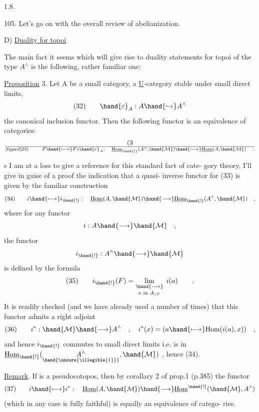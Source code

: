 
1.8. 

105.    Let's go on with the overall review of abelianization.

D)  \uline{Duality for topoi} 

The main fact it seems which will give rise to duality statements
for topoi of the type $A^\wedge$ is the following, rather familiar one:

\uline{Proposition} 3.   Let A be a small category,  a \uline{U}-category 
stable under small direct limits,
\[ (32) \qquad \hand{\varepsilon}_A : A \hand{\hookrightarrow} A^\wedge \]
the canonical inclusion functor.  Then the following functor is an
equivalence of categories:
\[ (3\over[typed]{2}{3}) \qquad F \hand{\longmapsto} F \circ \hand{\varepsilon}_A : \quad \underline{\mathrm{Hom}}_{\hand{!}}(A^\wedge,\hand{\mathcal{M}}) \hand{\longrightarrow} \underline{\mathrm{Hom}}(A,\hand{\mathcal{M}}) \quad . \]

s I am at a loss to give a reference for this standard fact of cate-%
gory theory,  I'll give in guise of a proof the indication that a quasi-
inverse functor for (33) is given by the familiar construction
\[ (34) \qquad i \hand{\longmapsto} i_{\hand{!}} : \quad \underline{\mathrm{Hom}}(A,\hand{\mathcal{M}}) \hand{\longrightarrow} \underline{\mathrm{Hom}}_{\hand{!}}(A^\wedge,\hand{\mathcal{M}}) \quad , \]
where for any functor
\[ i: A \hand{\longrightarrow} \hand{\mathcal{M}} \quad , \]
the functor  \hand{$_!$}
\[ i_{\hand{!}}: A^\wedge \hand{\longrightarrow} \hand{\mathcal{M}} \]
is defined by the formula
\[ (35) \qquad i_{\hand{!}}(F) = \mathop{\underset{\hand{\longrightarrow}}{\mathrm{lim}}}\limits_{a \text{ in } A_{/F}} \; i(a) \qquad . \]
It is readily checked (and we have already used a number of times)  that
this functor admits a right adjoint
\[ (36) \qquad i^{*} : \hand{\mathcal{M}} \hand{\longrightarrow} A^\wedge \quad , \quad i^{*}(x) = ( a \hand{\longmapsto} \mathrm{Hom}(i(a),x)) \quad , \]
and hence $i_{\hand{!}}$ commutes to small direct limits i.e. is in $\underline{\mathrm{Hom}}_{\hand{!}}(\underset{\hand{\unsure{\illegible{1}}}}{A^{\wedge}},\hand{\mathcal{M}})$ ,
hence (34).

\uline{Remark}. If  is a pseudocotopos,  then by   corollary 2 of prop.1 (p.385)
the functor
\[ (37) \qquad i \hand{\longmapsto} i^{*} : \quad \underline{\mathrm{Hom}}(A,\hand{\mathcal{M}}) \hand{\longrightarrow} \underline{\mathrm{Hom}}^{\hand{!}}(\hand{\mathcal{M}}, A^\wedge) \]
(which in any case is fully faithful) is equally an equivalence of catego-%
ries.

